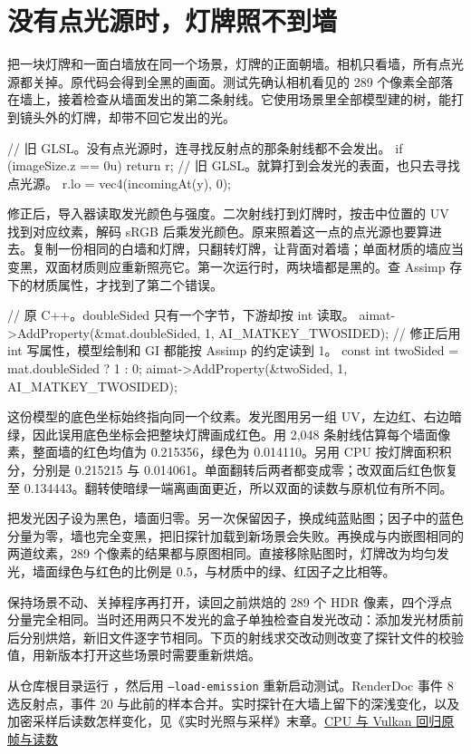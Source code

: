 \clearpage
\section{没有点光源时，灯牌照不到墙}

把一块灯牌和一面白墙放在同一个场景，灯牌的正面朝墙。相机只看墙，所有点光源都关掉。原代码会得到全黑的画面。测试先确认相机看见的 289 个像素全部落在墙上，接着检查从墙面发出的第二条射线。它使用场景里全部模型建的树，能打到镜头外的灯牌，却带不回它发出的光。

\begin{Code}
// 旧 GLSL。没有点光源时，连寻找反射点的那条射线都不会发出。
if (imageSize.z == 0u) return r;
// 旧 GLSL。就算打到会发光的表面，也只去寻找点光源。
r.lo = vec4(incomingAt(y), 0);
\end{Code}

修正后，导入器读取发光颜色与强度。二次射线打到灯牌时，按击中位置的 UV 找到对应纹素，解码 sRGB 后乘发光颜色。原来照着这一点的点光源也要算进去。复制一份相同的白墙和灯牌，只翻转灯牌，让背面对着墙；单面材质的墙应当变黑，双面材质则应重新照亮它。第一次运行时，两块墙都是黑的。查 Assimp 存下的材质属性，才找到了第二个错误。

\begin{Code}
// 原 C++。doubleSided 只有一个字节，下游却按 int 读取。
aimat->AddProperty(&mat.doubleSided, 1, AI_MATKEY_TWOSIDED);
// 修正后用 int 写属性，模型绘制和 GI 都能按 Assimp 的约定读到 1。
const int twoSided = mat.doubleSided ? 1 : 0;
aimat->AddProperty(&twoSided, 1, AI_MATKEY_TWOSIDED);
\end{Code}

这份模型的底色坐标始终指向同一个纹素。发光图用另一组 UV，左边红、右边暗绿，因此误用底色坐标会把整块灯牌画成红色。用 2,048 条射线估算每个墙面像素，整面墙的红色均值为 0.215356，绿色为 0.014110。另用 CPU 按灯牌面积积分，分别是 0.215215 与 0.014061。单面翻转后两者都变成零；改双面后红色恢复至 0.134443。翻转使暗绿一端离画面更近，所以双面的读数与原机位有所不同。

把发光因子设为黑色，墙面归零。另一次保留因子，换成纯蓝贴图；因子中的蓝色分量为零，墙也完全变黑，把旧探针加载到新场景会失败。再换成与内嵌图相同的两道纹素，289 个像素的结果都与原图相同。直接移除贴图时，灯牌改为均匀发光，墙面绿色与红色的比例是 $0.5$，与材质中的绿、红因子之比相等。

保持场景不动、关掉程序再打开，读回之前烘焙的 289 个 HDR 像素，四个浮点分量完全相同。当时还用两只不发光的盒子单独检查自发光改动：添加发光材质前后分别烘焙，新旧文件逐字节相同。下页的射线求交改动则改变了探针文件的校验值，用新版本打开这些场景时需要重新烘焙。

从仓库根目录运行 ，然后用 \texttt{--load-emission} 重新启动测试。RenderDoc 事件 8 选反射点，事件 20 与此前的样本合并。实时探针在大墙上留下的深浅变化，以及加密采样后读数怎样变化，见《实时光照与采样》末章。\href{run:../../tests/EmissiveGICheck.h}{CPU 与 Vulkan 回归}\quad\href{run:../profiling/emissive-gi/renderdoc.json}{原帧与读数}



